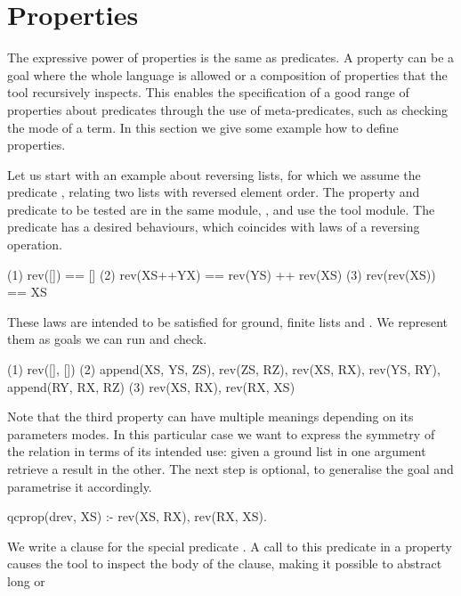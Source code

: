 
\section{Properties}
\label{sec:properties}


The expressive power of properties is the same as \Prolog{}
predicates.
%
A property can be a goal where the whole language is allowed or a
composition of properties that the \plqc{} tool recursively inspects.
%
This enables the specification of a good range of properties about
predicates through the use of meta-predicates, such as checking
the mode of a term.
%
In this section we give some example how to define properties.


Let us start with an example about reversing lists, for which we assume the
predicate , relating two lists with reversed element order.
%
The property and predicate to be tested are in the same module,
, and use the \plqc{} tool module.
%
The  predicate has a desired behaviours, which
coincides with laws of a reversing operation.
{
\begin{code}
(1)        rev([])     == []
(2)     rev(XS++YX)    == rev(YS) ++ rev(XS)
(3)      rev(rev(XS))  == XS
\end{code}
}
These laws are intended to be satisfied for ground, finite lists
 and .
%
We represent them as \Prolog{} goals we can run and check.
%
\begin{yapcode}
  (1)  rev([], [])
  (2)  append(XS, YS, ZS), rev(ZS, RZ),
        rev(XS, RX), rev(YS, RY),
         append(RY, RX, RZ)
  (3)  rev(XS, RX), rev(RX, XS)
\end{yapcode}
%
Note that the third property can have multiple meanings depending on its
parameters modes.
%
In this particular case we want to express the symmetry of the
 relation in terms of its intended use: given a ground
list in one argument retrieve a result in the other.
%
The next step is optional, to generalise the goal and parametrise it
accordingly.
%
\begin{yapcode}
 qcprop({drev, XS}) :-
   rev(XS, RX), rev(RX, XS).
\end{yapcode}
%
We write a clause for the special predicate .
%
A call to this predicate in a \plqc{} property causes the tool to
inspect the body of the clause, making it possible to abstract long or
